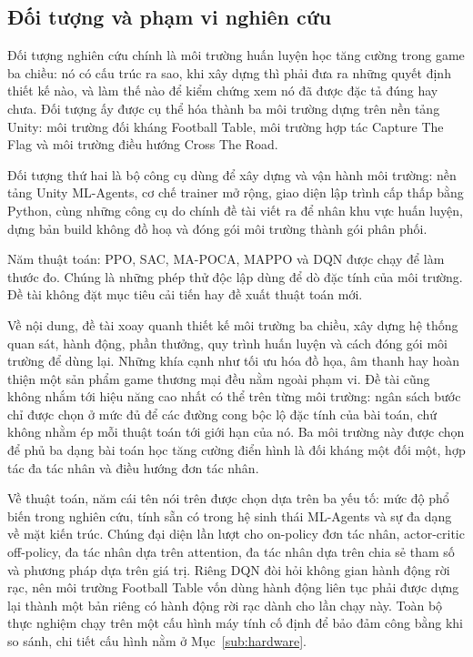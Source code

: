\subsection{Đối tượng và phạm vi nghiên cứu}

\indent Đối tượng nghiên cứu chính là môi trường huấn luyện học tăng cường trong
game ba chiều: nó có cấu trúc ra sao, khi xây dựng thì phải đưa ra những quyết định
thiết kế nào, và làm thế nào để kiểm chứng xem nó đã được đặc tả đúng hay chưa. Đối tượng
ấy được cụ thể hóa thành ba môi trường dựng trên nền tảng Unity: môi trường đối kháng
Football Table, môi trường hợp tác Capture The Flag và môi trường điều hướng Cross The
Road.

\indent Đối tượng thứ hai là bộ công cụ dùng để xây dựng và vận hành môi trường: nền tảng
Unity ML-Agents, cơ chế trainer mở rộng, giao diện lập trình cấp thấp bằng Python, cùng
những công cụ do chính đề tài viết ra để nhân khu vực huấn luyện, dựng bản build không đồ
hoạ và đóng gói môi trường thành gói phân phối.

\indent Năm thuật toán: PPO, SAC, MA-POCA, MAPPO và DQN được chạy để làm thước đo. Chúng là những phép thử độc lập dùng để dò đặc tính của môi
trường. Đề tài không đặt mục tiêu cải tiến hay đề xuất thuật toán mới.

\indent Về nội dung, đề tài xoay quanh thiết kế môi trường ba chiều, xây dựng hệ thống
quan sát, hành động, phần thưởng, quy trình huấn luyện và cách đóng gói môi trường để
dùng lại. Những khía cạnh như tối ưu hóa đồ họa, âm thanh hay hoàn thiện một sản phẩm
game thương mại đều nằm ngoài phạm vi. Đề tài cũng không nhắm tới hiệu năng cao nhất có
thể trên từng môi trường: ngân sách bước chỉ được chọn ở mức đủ để các đường cong bộc lộ
đặc tính của bài toán, chứ không nhằm ép mỗi thuật toán tới giới hạn của nó. Ba môi
trường này được chọn để phủ ba dạng bài toán học tăng cường điển hình là đối
kháng một đối một, hợp tác đa tác nhân và điều hướng đơn tác nhân.

\indent Về thuật toán, năm cái tên nói trên được chọn dựa trên ba yếu tố: mức độ phổ biến
trong nghiên cứu, tính sẵn có trong hệ sinh thái ML-Agents và sự đa dạng về mặt kiến
trúc. Chúng đại diện lần lượt cho on-policy đơn tác nhân, actor-critic off-policy, đa
tác nhân dựa trên attention, đa tác nhân dựa trên chia sẻ tham số và phương pháp dựa trên
giá trị. Riêng DQN đòi hỏi không gian hành động rời rạc, nên môi trường Football Table
vốn dùng hành động liên tục phải được dựng lại thành một bản riêng có hành động rời rạc
dành cho lần chạy này. Toàn bộ thực nghiệm chạy trên một cấu hình máy tính cố định để bảo
đảm công bằng khi so sánh, chi tiết cấu hình nằm ở Mục~\ref{sub:hardware}.

